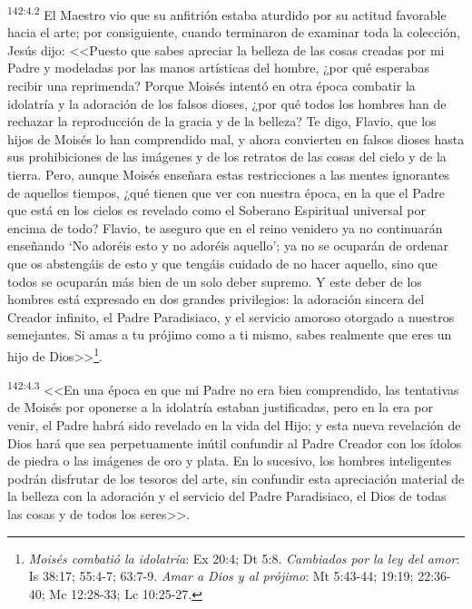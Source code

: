 \par 
\textsuperscript{142:4.2} El Maestro vio que su anfitrión estaba aturdido por su actitud favorable hacia el arte; por consiguiente, cuando terminaron de examinar toda la colección, Jesús dijo: <<Puesto que sabes apreciar la belleza de las cosas creadas por mi Padre y modeladas por las manos artísticas del hombre, ¿por qué esperabas recibir una reprimenda? Porque Moisés intentó en otra época combatir la idolatría y la adoración de los falsos dioses, ¿por qué todos los hombres han de rechazar la reproducción de la gracia y de la belleza? Te digo, Flavio, que los hijos de Moisés lo han comprendido mal, y ahora convierten en falsos dioses hasta sus prohibiciones de las imágenes y de los retratos de las cosas del cielo y de la tierra. Pero, aunque Moisés enseñara estas restricciones a las mentes ignorantes de aquellos tiempos, ¿qué tienen que ver con nuestra época, en la que el Padre que está en los cielos es revelado como el Soberano Espiritual universal por encima de todo? Flavio, te aseguro que en el reino venidero ya no continuarán enseñando `No adoréis esto y no adoréis aquello'; ya no se ocuparán de ordenar que os abstengáis de esto y que tengáis cuidado de no hacer aquello, sino que todos se ocuparán más bien de un solo deber supremo. Y este deber de los hombres está expresado en dos grandes privilegios: la adoración sincera del Creador infinito, el Padre Paradisiaco, y el servicio amoroso otorgado a nuestros semejantes. Si amas a tu prójimo como a ti mismo, sabes realmente que eres un hijo de Dios>>\footnote{\textit{Moisés combatió la idolatría}: Ex 20:4; Dt 5:8. \textit{Cambiados por la ley del amor}: Is 38:17; 55:4-7; 63:7-9. \textit{Amar a Dios y al prójimo}: Mt 5:43-44; 19:19; 22:36-40; Mc 12:28-33; Lc 10:25-27.}.

\par 
\textsuperscript{142:4.3} <<En una época en que mi Padre no era bien comprendido, las tentativas de Moisés por oponerse a la idolatría estaban justificadas, pero en la era por venir, el Padre habrá sido revelado en la vida del Hijo; y esta nueva revelación de Dios hará que sea perpetuamente inútil confundir al Padre Creador con los ídolos de piedra o las imágenes de oro y plata. En lo sucesivo, los hombres inteligentes podrán disfrutar de los tesoros del arte, sin confundir esta apreciación material de la belleza con la adoración y el servicio del Padre Paradisiaco, el Dios de todas las cosas y de todos los seres>>.

